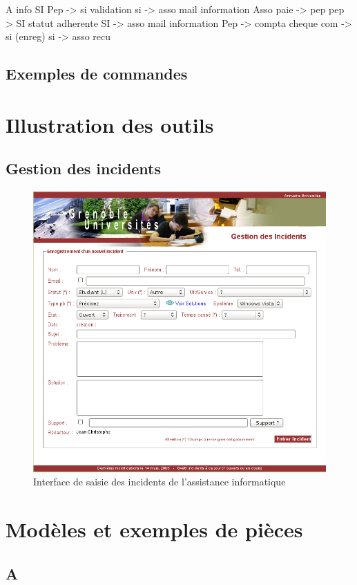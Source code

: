A info SI
Pep -> si validation
si -> asso mail information
Asso paie -> pep
pep > SI statut adherente
SI  -> asso mail information
Pep -> compta cheque
com -> si (enreg)
si -> asso recu


\subsection{Exemples de commandes}
\pagebreak
\section{Illustration des outils}
\subsection{Gestion des incidents}
\label{gestion_incidents}
\begin{figure}[!h]
	\centering
	\includegraphics[width=12cm]{annexes/images/gestion_des_incidents.png}
	\caption{Interface de saisie des incidents de l'assistance informatique}
\end{figure}
\clearpage
\section{Modèles et exemples de pièces}
\subsection{A}

